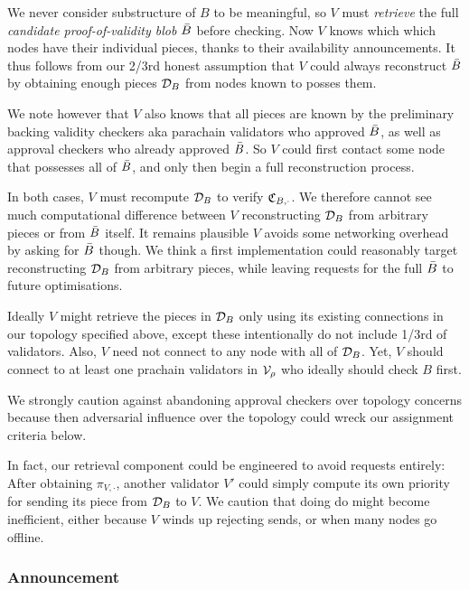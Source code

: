 We never consider substructure of $B$ to be meaningful, so $V$ must {\em retrieve} the full {\em candidate proof-of-validity blob} $\bar{B}$ before checking.  Now $V$ knows which which nodes have their individual pieces, thanks to their availability announcements.  It thus follows from our 2/3rd honest assumption that $V$ could always reconstruct $\bar{B}$ by obtaining enough pieces $\mathcal{D}_B$ from nodes known to posses them.  

We note however that $V$ also knows that all pieces are known by the preliminary backing validity checkers aka parachain validators who approved $\bar{B}$, as well as approval checkers who already approved $\bar{B}$.  So $V$ could first contact some node that possesses all of $\bar{B}$, and only then begin a full reconstruction process. 

In both cases, $V$ must recompute $\mathcal{D}_B$ to verify $\mathfrak{C}_{B,\cdot}$.  We therefore cannot see much computational difference between $V$ reconstructing $\mathcal{D}_B$ from arbitrary pieces or from $\bar{B}$ itself.  It remains plausible $V$ avoids some networking overhead by asking for $\bar{B}$ though.  We think a first implementation could reasonably target reconstructing $\mathcal{D}_B$ from arbitrary pieces, while leaving requests for the full $\bar{B}$ to future optimisations. 

Ideally $V$ might retrieve the pieces in $\mathcal{D}_B$ only using its existing connections in our topology specified above, except these intentionally do not include 1/3rd of validators.  Also, $V$ need not connect to any node with all of $\mathcal{D}_B$.  Yet, $V$ should connect to at least one prachain validators in $\mathcal{V}_\rho$ who ideally should check $B$ first.  

We strongly caution against abandoning approval checkers over topology concerns because then adversarial influence over the topology could wreck our assignment criteria below.

In fact, our retrieval component could be engineered to avoid requests entirely:  After obtaining $\pi_{V,\cdot}$, another validator $V'$ could simply compute its own priority for sending its piece from $\mathcal{D}_B$ to $V$.  We caution that doing do might become inefficient, either because $V$ winds up rejecting sends, or when many nodes go offline.  

\subsubsection{Announcement}

